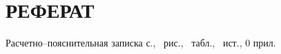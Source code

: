 \part*{РЕФЕРАТ}

Расчетно--пояснительная записка \pageref{LastPage} с., \totalfigures\ рис., \totaltables\ табл., \thetotalbibentries\ ист., 0 прил.	